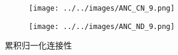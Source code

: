 \begin{figure}[ht]
    \centering
    \begin{subfigure}[t]{0.46\textwidth}
        \centering
        \texttt{[image: ../../images/ANC\_CN\_9.png]}
        \caption{}
        \label{fig:1a}
    \end{subfigure}
    \begin{subfigure}[t]{0.46\textwidth}
        \centering
        \texttt{[image: ../../images/ANC\_ND\_9.png]}
        \caption{}
        \label{fig:1b}
    \end{subfigure}
    \caption{累积归一化连接性}
    \label{fig:累积归一化连接性}
\end{figure}